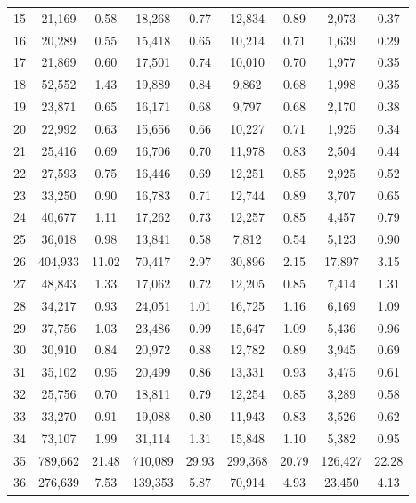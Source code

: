 \begin{table}[H]
{\begin{tabular}{c c c c c c c c c}
       15 & 21,169 &  0.58 & 18,268 &  0.77 & 12,834 &  0.89 & 2,073 &  0.37 \\ 
       16 & 20,289 &  0.55 & 15,418 &  0.65 & 10,214 &  0.71 & 1,639 &  0.29 \\ 
       17 & 21,869 &  0.60 & 17,501 &  0.74 & 10,010 &  0.70 & 1,977 &  0.35 \\ 
       18 & 52,552 &  1.43 & 19,889 &  0.84 & 9,862 &  0.68 & 1,998 &  0.35 \\ 
       19 & 23,871 &  0.65 & 16,171 &  0.68 & 9,797 &  0.68 & 2,170 &  0.38 \\ 
       20 & 22,992 &  0.63 & 15,656 &  0.66 & 10,227 &  0.71 & 1,925 &  0.34 \\ 
       21 & 25,416 &  0.69 & 16,706 &  0.70 & 11,978 &  0.83 & 2,504 &  0.44 \\ 
       22 & 27,593 &  0.75 & 16,446 &  0.69 & 12,251 &  0.85 & 2,925 &  0.52 \\ 
       23 & 33,250 &  0.90 & 16,783 &  0.71 & 12,744 &  0.89 & 3,707 &  0.65 \\ 
       24 & 40,677 &  1.11 & 17,262 &  0.73 & 12,257 &  0.85 & 4,457 &  0.79 \\ 
       25 & 36,018 &  0.98 & 13,841 &  0.58 & 7,812 &  0.54 & 5,123 &  0.90 \\ 
       26 & 404,933 & 11.02 & 70,417 &  2.97 & 30,896 &  2.15 & 17,897 &  3.15 \\ 
       27 & 48,843 &  1.33 & 17,062 &  0.72 & 12,205 &  0.85 & 7,414 &  1.31 \\ 
       28 & 34,217 &  0.93 & 24,051 &  1.01 & 16,725 &  1.16 & 6,169 &  1.09 \\ 
       29 & 37,756 &  1.03 & 23,486 &  0.99 & 15,647 &  1.09 & 5,436 &  0.96 \\ 
       30 & 30,910 &  0.84 & 20,972 &  0.88 & 12,782 &  0.89 & 3,945 &  0.69 \\ 
       31 & 35,102 &  0.95 & 20,499 &  0.86 & 13,331 &  0.93 & 3,475 &  0.61 \\ 
       32 & 25,756 &  0.70 & 18,811 &  0.79 & 12,254 &  0.85 & 3,289 &  0.58 \\ 
       33 & 33,270 &  0.91 & 19,088 &  0.80 & 11,943 &  0.83 & 3,526 &  0.62 \\ 
       34 & 73,107 &  1.99 & 31,114 &  1.31 & 15,848 &  1.10 & 5,382 &  0.95 \\ 
       35 & 789,662 & 21.48 & 710,089 & 29.93 & 299,368 & 20.79 & 126,427 & 22.28 \\ 
       36 & 276,639 &  7.53 & 139,353 &  5.87 & 70,914 &  4.93 & 23,450 &  4.13 \\ 
        \bottomrule
    \end{tabular}
    }
\end{table}


